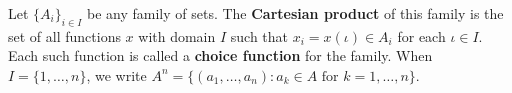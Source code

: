 Let \(\{A_i\}_{i \in I}\) be any family of sets. The \textbf{Cartesian product} of this family is the set of all functions \(x\) with domain \(I\) such that \(x_i = x(\iota) \in A_i\) for each \(\iota \in I\). Each such function is called a \textbf{choice function} for the family. When \(I = \{1, \ldots, n\}\), we write \(A^n = \{(a_1, \ldots, a_n) : a_k \in A \text{ for } k = 1, \ldots, n\}\).